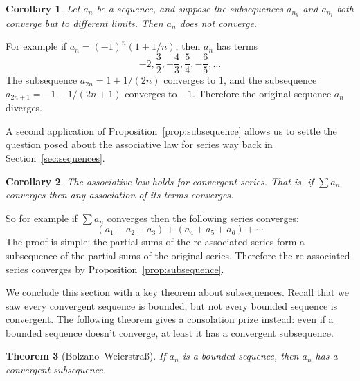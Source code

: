 \documentclass[11pt,oneside]{amsbook}
\theoremstyle{definition}
\theoremstyle{plain}
\newtheorem{theorem}{Theorem}[section]
\newtheorem{corollary}[theorem]{Corollary}
\theoremstyle{definition}
\theoremstyle{remark}
\numberwithin{equation}{section}
\numberwithin{figure}{section}
\begin{document}
\begin{corollary}
  \label{cor:divergence}
  Let $a_n$ be a sequence, and suppose the subsequences $a_{n_k}$ and $a_{n_l}$ both converge but to different limits. Then $a_n$ does not converge.
\end{corollary}

For example if $a_n=(-1)^n(1+1/n)$, then $a_n$ has terms
\[-2,\frac32,-\frac{4}{3},\frac54,-\frac{6}{5},\ldots
\]
The subsequence $a_{2n}=1+1/(2n)$ converges to $1$, and the subsequence $a_{2n+1}=-1-1/(2n+1)$ converges to $-1$. Therefore the original sequence $a_n$ diverges.

A second application of Proposition~\ref{prop:subsequence} allows us to settle the question posed about the associative law for series way back in Section~\ref{sec:sequences}.

\begin{corollary}
  The associative law holds for convergent series. That is, if $\sum a_n$ converges then any association of its terms converges.
\end{corollary}

So for example if $\sum a_n$ converges then the following series converges:
\[(a_1+a_2+a_3)+(a_4+a_5+a_6)+\cdots
\]
The proof is simple: the partial sums of the re-associated series form a subsequence of the partial sums of the original series. Therefore the re-associated series converges by Proposition~\ref{prop:subsequence}.

We conclude this section with a key theorem about subsequences. Recall that we saw every convergent sequence is bounded, but not every bounded sequence is convergent. The following theorem gives a consolation prize instead: even if a bounded sequence doesn't converge, at least it has a convergent subsequence.

\begin{theorem}[Bolzano--Weierstra\ss]
  If $a_n$ is a bounded sequence, then $a_n$ has a convergent subsequence.
\end{theorem}
\end{document}

